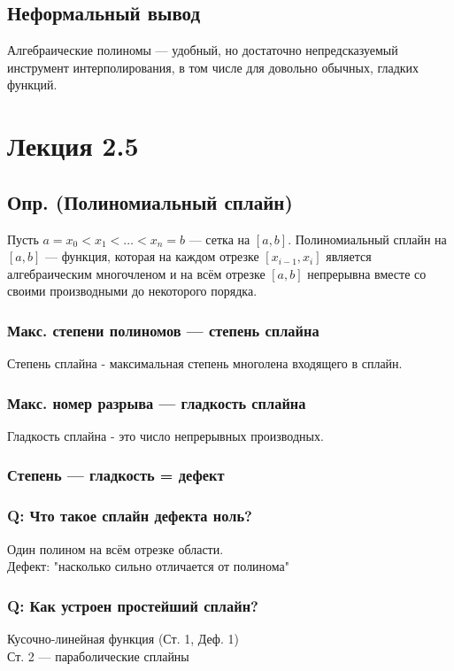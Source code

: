 \subsection*{Неформальный вывод}
Алгебраические полиномы --- удобный, но достаточно непредсказуемый инструмент интерполирования, в том числе для довольно обычных, гладких функций.

\section*{Лекция 2.5}

\subsection*{Опр. (Полиномиальный сплайн)}
Пусть $a = x_0 < x_1 < \ldots < x_n = b$ — сетка на $[a, b]$. Полиномиальный сплайн на $[a, b]$ --- функция, которая на каждом отрезке $[x_{i-1}, x_i]$ является алгебраическим многочленом и на всём отрезке $[a, b]$ непрерывна вместе со своими производными до некоторого порядка.

\subsubsection*{Макс. степени полиномов --- степень сплайна}
Степень сплайна - максимальная степень многолена входящего в сплайн.

\subsubsection*{Макс. номер разрыва --- гладкость сплайна}
Гладкость сплайна - это число непрерывных производных.

\subsubsection*{Степень --- гладкость = дефект}


\subsubsection*{Q: Что такое сплайн дефекта ноль?}
Один полином на всём отрезке области. \\    
Дефект: "насколько сильно отличается от полинома"

\subsubsection*{Q: Как устроен простейший сплайн?}
Кусочно-линейная функция (Ст. 1, Деф. 1) \\
Ст. 2 --- параболические сплайны

